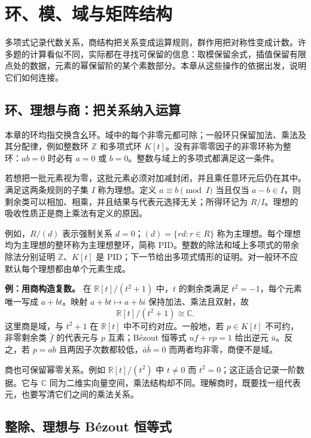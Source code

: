 \documentclass[UTF8,12pt,a4paper,fontset=fandol]{ctexart}
\begin{document}
\section{环、模、域与矩阵结构}

多项式记录代数关系，商结构把关系变成运算规则，群作用把对称性变成计数。许多题的计算看似不同，实际都在寻找可保留的信息：取模保留余式，插值保留有限点处的数据，元素的幂保留阶的某个素数部分。本章从这些操作的依据出发，说明它们如何连接。

\subsection{环、理想与商：把关系纳入运算}

\label{app:algebra-quotient}

本章的环均指交换含幺环。域中的每个非零元都可除；一般环只保留加法、乘法及其分配律，例如整数环 $\mathbb Z$ 和多项式环 $K[t]$。没有非零零因子的非零环称为整环：$ab=0$ 时必有 $a=0$ 或 $b=0$。整数与域上的多项式都满足这一条件。

若想把一批元素视为零，这批元素必须对加减封闭，并且乘任意环元后仍在其中。满足这两条规则的子集 $I$ 称为理想。定义 $a\equiv b\pmod I$ 当且仅当 $a-b\in I$，则剩余类可以相加、相乘，并且结果与代表元选择无关；所得环记为 $R/I$。理想的吸收性质正是商上乘法有定义的原因。

例如，$R/(d)$ 表示强制关系 $d=0$；$(d)=\{rd:r\in R\}$ 称为主理想。每个理想均为主理想的整环称为主理想整环，简称 PID。整数的除法和域上多项式的带余除法分别证明 $\mathbb Z$、$K[t]$ 是 PID；下一节给出多项式情形的证明。对一般环不应默认每个理想都由单个元素生成。

\textbf{例：用商构造复数。} 在 $\mathbb R[t]/(t^2+1)$ 中，$t$ 的剩余类满足 $t^2=-1$，每个元素唯一写成 $a+bt$。映射 $a+bt\mapsto a+bi$ 保持加法、乘法且双射，故
\[
\mathbb R[t]/(t^2+1)\cong\mathbb C.
\]
这里商是域，与 $t^2+1$ 在 $\mathbb R[t]$ 中不可约对应。一般地，若 $p\in K[t]$ 不可约，非零剩余类 $\bar f$ 的代表元与 $p$ 互素；Bézout 恒等式 $uf+vp=1$ 给出逆元 $\bar u$。反之，若 $p=ab$ 且两因子次数都较低，$\bar a\bar b=0$ 而两者均非零，商便不是域。

商也可保留幂零关系。例如 $\mathbb R[t]/(t^2)$ 中 $t\ne0$ 而 $t^2=0$；这正适合记录一阶数据。它与 $\mathbb C$ 同为二维实向量空间，乘法结构却不同。理解商时，既要找一组代表元，也要写清它们之间的乘法关系。

\subsection{整除、理想与 Bézout 恒等式}
\end{document}
